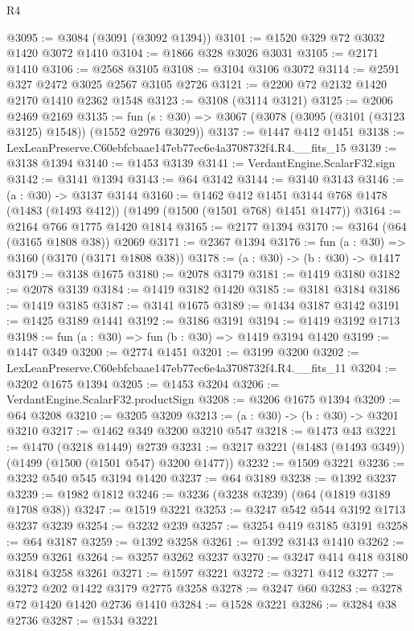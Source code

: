 \begin{lexlean}{R4}
\begin{coremodule}
@3095 := @3084 (@3091 (@3092 @1394))
@3101 := @1520 @329 @72 @3032 @1420 @3072 @1410
@3104 := @1866 @328 @3026 @3031
@3105 := @2171 @1410
@3106 := @2568 @3105
@3108 := @3104 @3106 @3072
@3114 := @2591 @327 @2472 @3025 @2567 @3105 @2726
@3121 := @2200 @72 @2132 @1420 @2170 @1410 @2362 @1548
@3123 := @3108 (@3114 @3121)
@3125 := @2006 @2469 @2169
@3135 := fun (s : @30) => @3067 (@3078 (@3095 (@3101 (@3123 @3125) @1548)) (@1552 @2976 @3029))
@3137 := @1447 @412 @1451
@3138 := LexLeanPreserve.C60ebfcbaae147eb77ec6e4a3708732f4.R4.__fits_15
@3139 := @3138 @1394
@3140 := @1453 @3139
@3141 := VerdantEngine.ScalarF32.sign
@3142 := @3141 @1394
@3143 := @64 @3142
@3144 := @3140 @3143
@3146 := (a : @30) -> @3137 @3144
@3160 := @1462
    @412
    @1451
    @3144
    @768
    @1478
    (@1483 (@1493 @412))
    (@1499 (@1500 (@1501 @768) @1451 @1477))
@3164 := @2164 @766 @1775 @1420 @1814
@3165 := @2177 @1394
@3170 := @3164 (@64 (@3165 @1808 @38)) @2069
@3171 := @2367 @1394
@3176 := fun (a : @30) => @3160 (@3170 (@3171 @1808 @38))
@3178 := (a : @30) -> (b : @30) -> @1417
@3179 := @3138 @1675
@3180 := @2078 @3179
@3181 := @1419 @3180
@3182 := @2078 @3139
@3184 := @1419 @3182 @1420
@3185 := @3181 @3184
@3186 := @1419 @3185
@3187 := @3141 @1675
@3189 := @1434 @3187 @3142
@3191 := @1425 @3189 @1441
@3192 := @3186 @3191
@3194 := @1419 @3192 @1713
@3198 := fun (a : @30) => fun (b : @30) => @1419 @3194 @1420
@3199 := @1447 @349
@3200 := @2774 @1451
@3201 := @3199 @3200
@3202 := LexLeanPreserve.C60ebfcbaae147eb77ec6e4a3708732f4.R4.__fits_11
@3204 := @3202 @1675 @1394
@3205 := @1453 @3204
@3206 := VerdantEngine.ScalarF32.productSign
@3208 := @3206 @1675 @1394
@3209 := @64 @3208
@3210 := @3205 @3209
@3213 := (a : @30) -> (b : @30) -> @3201 @3210
@3217 := @1462 @349 @3200 @3210 @547
@3218 := @1473 @43
@3221 := @1470 (@3218 @1449) @2739
@3231 := @3217 @3221 (@1483 (@1493 @349)) (@1499 (@1500 (@1501 @547) @3200 @1477))
@3232 := @1509 @3221
@3236 := @3232 @540 @545 @3194 @1420
@3237 := @64 @3189
@3238 := @1392 @3237
@3239 := @1982 @1812
@3246 := @3236 (@3238 @3239) (@64 (@1819 @3189 @1708 @38))
@3247 := @1519 @3221
@3253 := @3247 @542 @544 @3192 @1713 @3237 @3239
@3254 := @3232 @239
@3257 := @3254 @419 @3185 @3191
@3258 := @64 @3187
@3259 := @1392 @3258
@3261 := @1392 @3143 @1410
@3262 := @3259 @3261
@3264 := @3257 @3262 @3237
@3270 := @3247 @414 @418 @3180 @3184 @3258 @3261
@3271 := @1597 @3221
@3272 := @3271 @412
@3277 := @3272 @202 @1422 @3179 @2775 @3258
@3278 := @3247 @60
@3283 := @3278 @72 @1420 @1420 @2736 @1410
@3284 := @1528 @3221
@3286 := @3284 @38 @2736
@3287 := @1534 @3221

\end{coremodule}
\end{lexlean}
